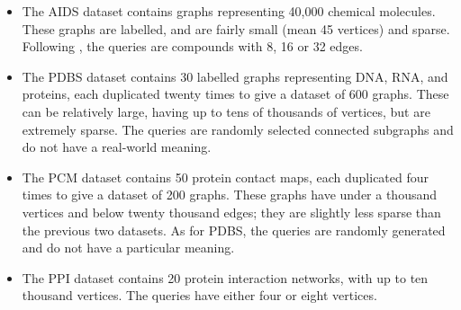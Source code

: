 \documentclass[twoside,11pt]{article}
\begin{document}
\begin{itemize}
    \item The AIDS dataset contains graphs representing 40,000 chemical molecules. These graphs are
        labelled, and are fairly small (mean 45 vertices) and sparse. Following
        \citeauthor{o:10.1371/journal.pone.0076911}, the queries are compounds with 8, 16 or 32
        edges.
    \item The PDBS dataset \cite{o:HeLCBBSKMR02} contains 30 labelled graphs representing DNA, RNA,
        and proteins, each duplicated twenty times to give a dataset of 600 graphs. These
        can be relatively large, having up to tens of thousands of vertices, but are extremely
        sparse. The queries are randomly selected connected subgraphs and do not have a real-world
        meaning.
    \item The PCM dataset \cite{o:doi:10.1093/bioinformatics/btr163} contains 50 protein contact
        maps, each duplicated four times to give a dataset of 200 graphs. These graphs have under a
        thousand vertices and below twenty thousand edges; they are slightly less sparse than the
        previous two datasets. As for PDBS, the queries are randomly generated and do not have a
        particular meaning.
    \item The PPI dataset contains 20 protein interaction networks, with up to ten thousand
        vertices. The queries have either four or eight vertices.
\end{itemize}
\end{document}
